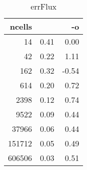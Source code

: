\documentclass[11pt]{article}
\begin{document}
\begin{table}[!htbp]
\begin{center}
\begin{tabular}{r||r|r}
ncells           &                  & -o              \\\hline\hline
             14&      0.41&    0.00\\\hline
             42&      0.22&    1.11\\\hline
            162&      0.32&   -0.54\\\hline
            614&      0.20&    0.72\\\hline
           2398&      0.12&    0.74\\\hline
           9522&      0.09&    0.44\\\hline
          37966&      0.06&    0.44\\\hline
         151712&      0.05&    0.49\\\hline
         606506&      0.03&    0.51\\\hline
\end{tabular}
\caption{errFlux}
\end{center}
\label{tab:errFlux}
\end{table}
%
%

\end{document}
